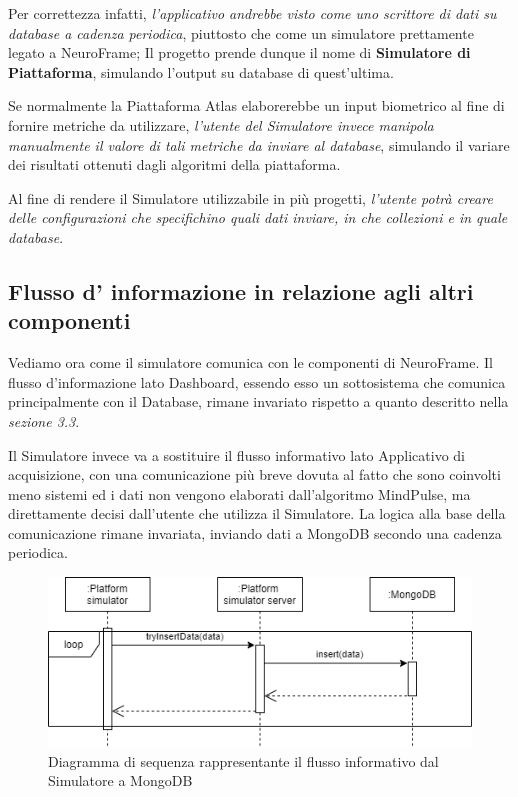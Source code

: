 \noindent Per correttezza infatti, \emph{l'applicativo andrebbe visto come uno scrittore di dati su database a cadenza periodica}, piuttosto che come un simulatore prettamente legato a NeuroFrame; 
Il progetto prende dunque il nome di {\bf Simulatore di Piattaforma}, simulando l'output su database di quest'ultima.

\noindent Se normalmente la Piattaforma Atlas elaborerebbe un input biometrico al fine di fornire metriche da utilizzare, \emph{l'utente del Simulatore invece manipola manualmente il valore di tali metriche da inviare al database}, simulando il variare dei risultati ottenuti dagli algoritmi della piattaforma.\newline

\noindent Al fine di rendere il Simulatore utilizzabile in più progetti, \emph{l'utente potrà creare delle configurazioni che specifichino quali dati inviare, in che collezioni e in quale database}.
\subsection{Flusso d' informazione in relazione agli altri componenti}
Vediamo ora come il simulatore comunica con le componenti di NeuroFrame.\newline
Il flusso d'informazione lato Dashboard, essendo esso un sottosistema che comunica principalmente con il Database, rimane invariato rispetto a quanto descritto nella \emph{sezione 3.3}.\newline

\noindent Il Simulatore invece va a sostituire il flusso informativo lato Applicativo di acquisizione, con una comunicazione più breve dovuta al fatto che sono coinvolti meno sistemi ed i dati non vengono elaborati dall'algoritmo MindPulse, ma direttamente decisi dall'utente che utilizza il Simulatore.\newline
La logica alla base della comunicazione rimane invariata, inviando dati a MongoDB secondo una cadenza periodica.
\vspace{10mm}
\begin{figure}[H]
  \centering
  \includegraphics[width=1.0\textwidth]{img/diagramma_sequenza_simulatore.png}
  \caption{Diagramma di sequenza rappresentante il flusso informativo dal Simulatore a MongoDB}
\end{figure}

